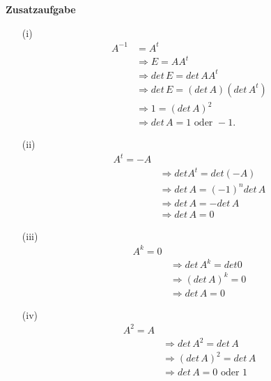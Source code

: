 \documentclass[11pt]{report}
\newcommand*\f[1] {\textbf{#1}}
\begin{document}
\f{Zusatzaufgabe}
\begin{itemize}
\item[(i)] 
\begin{align}
A^{-1} &= A^t\\
&\Rightarrow E = AA^{t} \\
&\Rightarrow det\,E = det\,AA^t \\
&\Rightarrow  det\,E = (det\,A)(det\,A^t) \\
&\Rightarrow 1 = (det\,A)^2 \\
&\Rightarrow  det\,A = 1 \text{ oder } -1.
\end{align}
\item[(ii)] 
\begin{align}
A^t = -A \\
&\Rightarrow  det A^t = det(-A) \\
&\Rightarrow det\,A = (-1)^n det\,A \\
&\Rightarrow det\,A = - det\,A \\
&\Rightarrow det\,A = 0
\end{align}

\item[(iii)]
\begin{align}
A^k = 0 \\
&\Rightarrow det\,A^k = det 0 \\
&\Rightarrow (det\,A)^k = 0 \\
&\Rightarrow det\,A = 0
\end{align}

\item[(iv)]
\begin{align}
A^2 = A \\
&\Rightarrow det\,A^2 = det\,A \\
&\Rightarrow (det\,A)^2 = det\,A \\
&\Rightarrow det\,A = 0 \text{ oder } 1
\end{align}
\end{itemize}

\printindex
\end{document}
